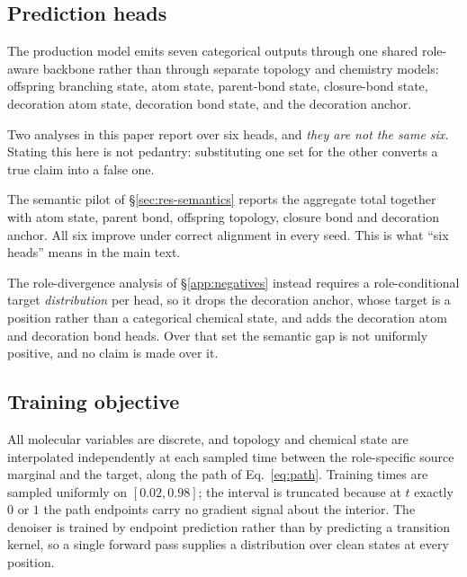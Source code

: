 \documentclass{article}
\newcommand{\SemHeads}{six}                   %
\begin{document}
\subsection{Prediction heads}
\label{app:heads}
The production model emits seven categorical outputs through one shared role-aware backbone rather
than through separate topology and chemistry models: offspring branching state, atom state,
parent-bond state, closure-bond state, decoration atom state, decoration bond state, and the
decoration anchor.

Two analyses in this paper report over six heads, and \emph{they are not the same six}. Stating this
here is not pedantry: substituting one set for the other converts a true claim into a false one.

The semantic pilot of \S\ref{sec:res-semantics} reports the aggregate total together with
atom state, parent bond, offspring topology, closure bond and decoration anchor. All six improve under
correct alignment in every seed. This is what ``\SemHeads{} heads'' means in the main text.

The role-divergence analysis of \S\ref{app:negatives} instead requires a role-conditional
target \emph{distribution} per head, so it drops the decoration anchor, whose target is a position
rather than a categorical chemical state, and adds the decoration atom and decoration bond heads. Over
that set the semantic gap is not uniformly positive, and no claim is made over it.

\subsection{Training objective}
\label{app:objective}
All molecular variables are discrete, and topology and chemical state are interpolated
independently at each sampled time between the role-specific source marginal and the target, along
the path of Eq.~\eqref{eq:path}. Training times are sampled uniformly on $[0.02, 0.98]$; the interval
is truncated because at $t$ exactly $0$ or $1$ the path endpoints carry no gradient signal about the
interior. The denoiser is trained by endpoint prediction rather than by predicting a transition
kernel, so a single forward pass supplies a distribution over clean states at every position.
\end{document}

